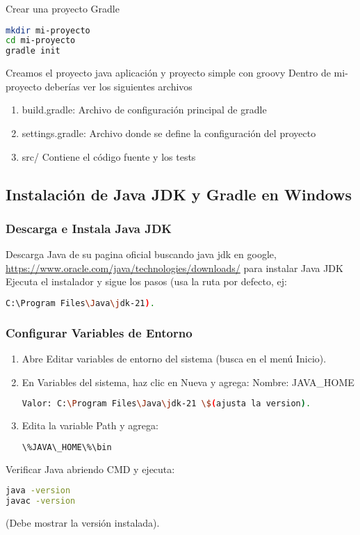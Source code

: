 Crear una proyecto Gradle
\begin{lstlisting}[language=bash]
mkdir mi-proyecto
cd mi-proyecto
gradle init
\end{lstlisting}
Creamos el proyecto java aplicación y proyecto simple con groovy
Dentro de mi-proyecto deberías ver los siguientes archivos\\
\begin{enumerate}
  \item build.gradle: Archivo de configuración principal de gradle
  \item settings.gradle: Archivo donde se define la configuración del proyecto
  \item src/ Contiene el código fuente y los tests
\end{enumerate}

\subsection{Instalación de Java JDK y Gradle en Windows}
\subsubsection{Descarga e Instala Java JDK}
Descarga Java de su pagina oficial buscando java jdk en google, \url{https://www.oracle.com/java/technologies/downloads/}  para instalar Java JDK Ejecuta el instalador y sigue los pasos (usa la ruta por defecto, ej: 
\begin{lstlisting}[language=bash]
C:\Program Files\Java\jdk-21).
\end{lstlisting}
\subsubsection{Configurar Variables de Entorno} 
\begin{enumerate}
  \item Abre Editar variables de entorno del sistema (busca en el menú Inicio).
  \item En Variables del sistema, haz clic en Nueva y agrega: Nombre: JAVA\_HOME
\\
\begin{lstlisting}[language=bash]
Valor: C:\Program Files\Java\jdk-21 \$(ajusta la version).
\end{lstlisting}
\item Edita la variable Path y agrega:
\begin{lstlisting}[language=bash]
\%JAVA\_HOME\%\bin
\end{lstlisting}
\end{enumerate}
Verificar Java abriendo CMD y ejecuta:
\begin{lstlisting}[language=bash]
java -version
javac -version
\end{lstlisting}
(Debe mostrar la versión instalada).
\\
